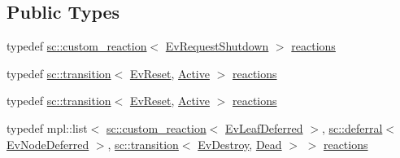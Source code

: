 \subsection*{Public Types}
\begin{DoxyCompactItemize}
\item 
typedef \mbox{\hyperlink{classboost_1_1statechart_1_1custom__reaction}{sc\+::custom\+\_\+reaction}}$<$ \mbox{\hyperlink{struct_ev_request_shutdown}{Ev\+Request\+Shutdown}} $>$ \mbox{\hyperlink{struct_active_a628dd827d0faf3cd002f59a8d17f189d}{reactions}}
\item 
typedef \mbox{\hyperlink{classboost_1_1statechart_1_1transition}{sc\+::transition}}$<$ \mbox{\hyperlink{struct_ev_reset}{Ev\+Reset}}, \mbox{\hyperlink{struct_active}{Active}} $>$ \mbox{\hyperlink{struct_active_a86282569cdd6a34df7d2580364c79857}{reactions}}
\item 
typedef \mbox{\hyperlink{classboost_1_1statechart_1_1transition}{sc\+::transition}}$<$ \mbox{\hyperlink{struct_ev_reset}{Ev\+Reset}}, \mbox{\hyperlink{struct_active}{Active}} $>$ \mbox{\hyperlink{struct_active_a86282569cdd6a34df7d2580364c79857}{reactions}}
\item 
typedef mpl\+::list$<$ \mbox{\hyperlink{classboost_1_1statechart_1_1custom__reaction}{sc\+::custom\+\_\+reaction}}$<$ \mbox{\hyperlink{struct_ev_leaf_deferred}{Ev\+Leaf\+Deferred}} $>$, \mbox{\hyperlink{classboost_1_1statechart_1_1deferral}{sc\+::deferral}}$<$ \mbox{\hyperlink{struct_ev_node_deferred}{Ev\+Node\+Deferred}} $>$, \mbox{\hyperlink{classboost_1_1statechart_1_1transition}{sc\+::transition}}$<$ \mbox{\hyperlink{struct_ev_destroy}{Ev\+Destroy}}, \mbox{\hyperlink{struct_dead}{Dead}} $>$ $>$ \mbox{\hyperlink{struct_active_a3f41c16a9522a432b7c51738621d8650}{reactions}}
\end{DoxyCompactItemize}
